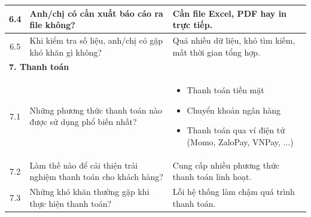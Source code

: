 \documentclass[a4paper,12pt]{report}
\begin{document}
\begin{longtable}{|c|p{8cm}|p{7cm}|}
    \hline
    6.4          & Anh/chị có cần xuất báo cáo ra file không?                                                                              & Cần file Excel, PDF hay in trực tiếp.                                                                                    \\
    \hline
    6.5          & Khi kiểm tra số liệu, anh/chị có gặp khó khăn gì không?                                                                 & Quá nhiều dữ liệu, khó tìm kiếm, mất thời gian tổng hợp.                                                                 \\
    \hline
    \multicolumn{3}{|l|}{\textbf{7. Thanh toán}}                                                                                                                                                                                                                      \\
    \hline
    7.1          & Những phương thức thanh toán nào được sử dụng phổ biến nhất?                                                            &
    \begin{itemize}
        \item Thanh toán tiền mặt
        \item Chuyển khoản ngân hàng
        \item Thanh toán qua ví điện tử (Momo, ZaloPay, VNPay, ...)
    \end{itemize}                                                                                                                                                                                                        \\
    \hline
    7.2          & Làm thế nào để cải thiện trải nghiệm thanh toán cho khách hàng?                                                         & Cung cấp nhiều phương thức thanh toán linh hoạt.                                                                         \\
    \hline
    7.3          & Những khó khăn thường gặp khi thực hiện thanh toán?                                                                     & Lỗi hệ thống làm chậm quá trình thanh toán.                                                                              \\
    \hline
\end{longtable}
\end{document}
